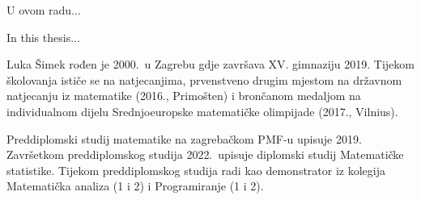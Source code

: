 \documentclass[a4paper,twoside,12pt]{memoir}
\numberwithin{teorem}{section}
\numberwithin{equation}{chapter}
\numberwithin{figure}{chapter}
\numberwithin{table}{chapter}
\begin{document}
\fontsize{11pt}{13.pt}\selectfont















\fontsize{12pt}{15pt}\selectfont

\printbibliography
\pagestyle{empty}

\begin{sazetak}
	U ovom radu...
\end{sazetak}

\begin{summary}
	In this thesis...
\end{summary}

\begin{cv}
	Luka Šimek rođen je 2000.\ u Zagrebu gdje završava XV. gimnaziju 2019. Tijekom školovanja ističe se na natjecanjima, prvenstveno drugim mjestom na državnom natjecanju iz matematike (2016., Primošten) i brončanom medaljom na individualnom dijelu Srednjoeuropske matematičke olimpijade (2017., Vilnius).

	Preddiplomski studij matematike na zagrebačkom PMF-u upisuje 2019. Završetkom preddiplomskog studija 2022.\ upisuje diplomski studij Matematičke statistike. Tijekom preddiplomskog studija radi kao demonstrator iz kolegija Matematička analiza (1 i 2) i Programiranje (1 i 2).
\end{cv}
\end{document}
